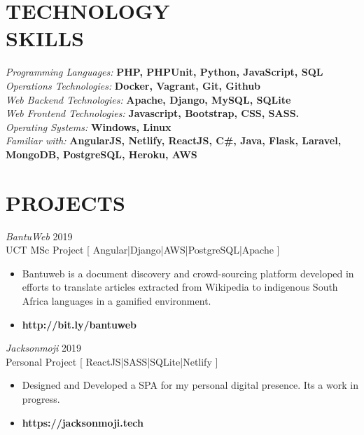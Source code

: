\documentclass[margin, 10pt]{res}
\begin{document}
\begin{resume}


\section{TECHNOLOGY \\ SKILLS} 

{\sl Programming Languages:} \textbf{PHP, PHPUnit, Python, JavaScript, SQL} \\
{\sl Operations Technologies:}\textbf{ Docker, Vagrant, Git, Github} \\
{\sl Web Backend Technologies:} \textbf{ Apache, Django, MySQL, SQLite } \\
{\sl Web Frontend Technologies:} \textbf{ Javascript, Bootstrap, CSS, SASS.} \\
{\sl Operating Systems:} \textbf{ Windows, Linux } \\
{\sl Familiar with:} \textbf{ AngularJS, Netlify, ReactJS, C\#, Java, Flask, Laravel, MongoDB, PostgreSQL, Heroku, AWS} \\


\section{PROJECTS}

{\sl BantuWeb} \hfill 2019 \\
UCT MSc Project [ Angular|Django|AWS|PostgreSQL|Apache ]
\begin{itemize} \itemsep -2pt %
\item Bantuweb is a document discovery and crowd-sourcing platform developed in efforts to translate articles extracted from Wikipedia to indigenous South Africa languages in a gamified environment.
\item \textbf{ http://bit.ly/bantuweb}
\end{itemize}

{\sl Jacksonmoji} \hfill 2019 \\
Personal Project [ ReactJS|SASS|SQLite|Netlify ]
\begin{itemize} \itemsep -2pt %
\item Designed and Developed a SPA for my personal digital presence. Its a work in progress.
\item \textbf{https://jacksonmoji.tech}
\end{itemize}



\end{resume}
\end{document}

